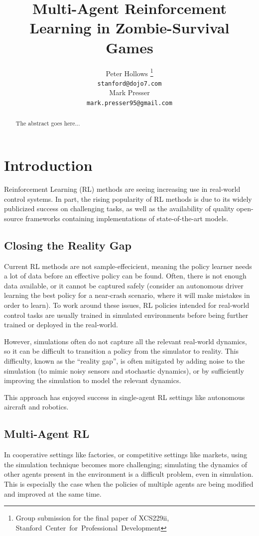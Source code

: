 \documentclass[11pt,a4paper]{article}
\title{Multi-Agent Reinforcement Learning in Zombie-Survival Games}
\author{
  Peter Hollows
  \thanks {
    Group submission for the final paper of XCS229ii,
    \mbox{Stanford Center for Professional Development}
  }
  \\ \texttt{stanford@dojo7.com} \\
  \And
  Mark Presser
  \footnotemark[1]
  \\ \texttt{mark.presser95@gmail.com} \\
}
\date{}
\begin{document}
\maketitle
\begin{abstract}
  The abstract goes here...
\end{abstract}

\section{Introduction}

Reinforcement Learning (RL) methods are seeing increasing use in real-world control systems.
In part, the rising popularity of RL methods is due to its widely publicized success on challenging tasks,
as well as the availability of quality open-source frameworks containing implementations of state-of-the-art models.

\subsection{Closing the Reality Gap}

Current RL methods are not sample-effecicient, meaning the policy learner needs a lot of data before an effective policy can be found.
Often, there is not enough data available, or it cannot be captured safely (consider an autonomous driver learning the best policy for a near-crash scenario, where it will make mistakes in order to learn).
To work around these issues, RL policies intended for real-world control tasks are usually trained in simulated environments before being further trained or deployed in the real-world.

However, simulations often do not capture all the relevant real-world dynamics, so it can be difficult to transition a policy from the simulator to reality.
This difficulty, known as the ``reality gap'', is often mitigated by adding noise to the simulation (to mimic noisy sensors and stochastic dynamics),
or by sufficiently improving the simulation to model the relevant dynamics.

This approach has enjoyed success in single-agent RL settings like autonomous aircraft and robotics.

\subsection{Multi-Agent RL}

In cooperative settings like factories, or competitive settings like markets, using the simulation technique becomes more challenging;
simulating the dynamics of other agents present in the environment is a difficult problem, even in simulation.
This is especially the case when the policies of multiple agents are being modified and improved at the same time.
\end{document}
